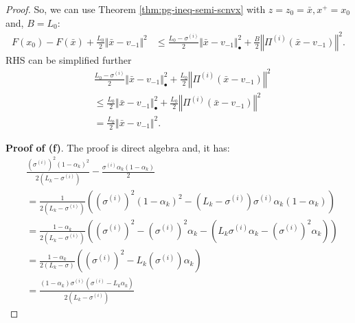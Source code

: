 \documentclass[12pt]{article}
\begin{document}
\begin{proof}
        So, we can use Theorem \ref{thm:pg-ineq-semi-scnvx} with $z = z_0 = \bar x, x^+ = x_0$ and, $B = L_0$: 
        \begin{align*}
            F(x_0) - F(\bar x) + \frac{L_0}{2}\Vert \bar x - v_{-1}\Vert^2 
            &\le 
            \frac{L_0 - \sigma^{(i)}}{2}\Vert \bar x - v_{-1} \Vert^2_\bullet
            + \frac{B}{2}\left\Vert \Pi^{(i)}(\bar x - v_{-1})\right\Vert^2. 
        \end{align*}
        RHS can be simplified further
        \begin{align*}
            & \frac{L_0 - \sigma^{(i)}}{2}\Vert \bar x - v_{-1} \Vert^2_\bullet
            + \frac{L_0}{2}\left\Vert \Pi^{(i)}(\bar x - v_{-1})\right\Vert^2
            \\
            &\le \frac{L_0}{2}\Vert \bar x - v_{-1} \Vert^2_\bullet
            + \frac{L_0}{2}\left\Vert \Pi^{(i)}(\bar x - v_{-1})\right\Vert^2
            \\
            & = \frac{L_0}{2}\Vert \bar x - v_{-1}\Vert^2. 
        \end{align*}
        \par
        \textbf{Proof of (f)}. 
        The proof is direct algebra and, it has: 
        {\small\allowdisplaybreaks
        \begin{align*}
            & \frac{\left(\sigma^{(i)}\right)^2(1 - \alpha_k)^2}{2(L_k - \sigma^{(i)})} 
            - \frac{\sigma^{(i)}\alpha_k(1 - \alpha_k)}{2}
            \\
            &= 
            \frac{1}{2\left(L_k - \sigma^{(i)}\right)}
            \left(
                \left(\sigma^{(i)}\right)^2(1 - \alpha_k)^2
                - \left(L_k - \sigma^{(i)}\right)\sigma^{(i)} \alpha_k(1 - \alpha_k)
            \right)
            \\
            &= \frac{1 - \alpha_k}{2\left(L_k - \sigma^{(i)}\right)}\left(
                \left(\sigma^{(i)}\right)^2 
                - \left(\sigma^{(i)}\right)^2\alpha_k 
                - \left(L_k \sigma^{(i)} \alpha_k - \left(\sigma^{(i)}\right)^2 \alpha_k\right)
            \right)
            \\
            &= 
            \frac{1 - \alpha_k}{2(L_k - \sigma)}\left(
                \left(\sigma^{(i)}\right)^2 - L_k\left(\sigma^{(i)}\right)\alpha_k
            \right)
            \\
            &= 
            \frac{(1 - \alpha_k)\sigma^{(i)}\left(\sigma^{(i)} - L_k\alpha_k\right)}
            {2\left(L_k - \sigma^{(i)}\right)}

\end{align*}}
\end{proof}
\end{document}
